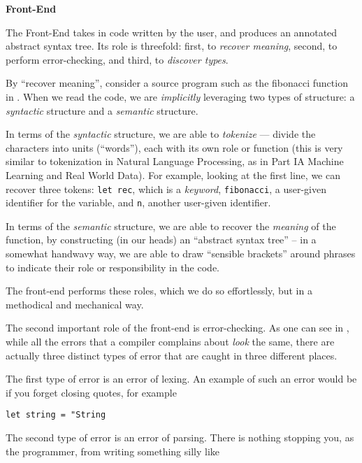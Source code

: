 \begin{minipage}[t]{0.15\textwidth}
    \textbf{\sffamily Front-End}
\end{minipage}%
\begin{minipage}[t]{0.85\textwidth}
    The Front-End takes in code written by the user, and produces an annotated abstract syntax tree. Its role is threefold: first, to \emph{recover meaning}, second, to perform error-checking, and third, to \emph{discover types}.

    By ``recover meaning'', consider a source program such as the fibonacci function in . When we read the code, we are \emph{implicitly} leveraging two types of structure: a \emph{syntactic} structure and a \emph{semantic} structure.

    In terms of the \emph{syntactic} structure, we are able to \emph{tokenize} --- divide the characters into units (``words''), each with its own role or function (this is very similar to tokenization in Natural Language Processing, as in {\sffamily Part IA Machine Learning and Real World Data}). For example, looking at the first line, we can recover three tokens: \texttt{let rec}, which is a \emph{keyword}, \texttt{fibonacci}, a user-given identifier for the variable, and \texttt{n}, another user-given identifier. 

    In terms of the \emph{semantic} structure, we are able to recover the \emph{meaning} of the function, by constructing (in our heads) an ``abstract syntax tree'' -- in a somewhat handwavy way, we are able to draw ``sensible brackets'' around phrases to indicate their role or responsibility in the code.

    The front-end performs these roles, which we do so effortlessly, but in a methodical and mechanical way. 

    The second important role of the front-end is error-checking. As one can see in , while all the errors that a compiler complains about \emph{look} the same, there are actually three distinct types of error that are caught in three different places. 

    The first type of error is an error of lexing. An example of such an error would be if you forget closing quotes, for example

\begin{verbatim}
let string = "String
\end{verbatim}
    
    The second type of error is an error of parsing. There is nothing stopping you, as the programmer, from writing something silly like 


\end{minipage}
